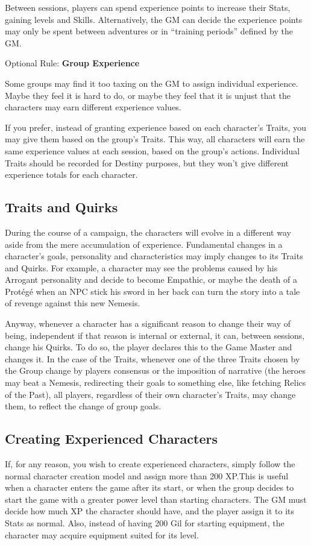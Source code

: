 \begin{multicols}{2}
Between sessions, players can spend experience points to increase their Stats, gaining levels and Skills. Alternatively, the GM can decide the experience points may only be spent  between adventures or  in ``training periods'' defined by the GM.\@{}

\begin{boco}
Optional Rule: \textbf{Group Experience}

Some groups may find it too taxing on the GM to assign individual experience. Maybe they feel it is hard to do, or maybe they feel that it is unjust that the characters may earn different experience values.

If you prefer, instead of granting experience based on each character's Traits, you may give them based on the group's Traits. This way, all characters will earn the same experience values at each session, based on the group's actions. Individual Traits should be recorded for Destiny purposes, but they won't give different experience totals for each character.
\end{boco}

\subsection{Traits and Quirks}\label{subsec:gm-traits}
During the course of a campaign, the characters will evolve in a different way aside from the mere accumulation of experience. Fundamental changes in a character’s goals, personality and characteristics may imply changes to its Traits and Quirks. For example, a character may see the problems caused by his Arrogant personality and decide to become Empathic, or maybe the death of a Prot\'eg\'e when an NPC stick his sword in her back can turn the story into a tale of revenge against this new Nemesis.

Anyway, whenever a character has a significant reason to change their way of being, independent if that reason is internal or external, it can, between sessions, change his Quirks. To do so, the player declares this to the Game Master and changes it. In the case of the Traits, whenever one of the three Traits chosen by the Group change by players consensus or the imposition of narrative (the heroes may beat a Nemesis, redirecting their goals to something else, like fetching Relics of the Past), all players, regardless of their own character’s Traits, may change them, to reflect the change of group goals.

\subsection{Creating Experienced Characters}\label{subsec:gm-expchars}
If, for any reason, you wish to create experienced characters, simply follow the normal character creation model and assign more than 200 XP.\@{}This is useful when a character enters the game after its start, or when the group decides to start the game with a greater power level than starting characters. The GM must decide how much XP the character should have, and the player assign it to its Stats as normal. Also, instead of having 200 Gil for starting equipment, the character may acquire equipment suited for its level.


\end{multicols}
